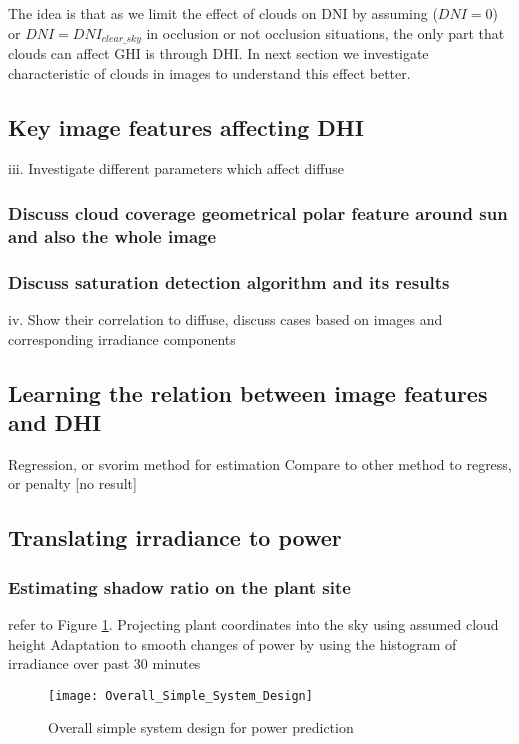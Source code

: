 The idea is that as we limit the effect of clouds on DNI by assuming ($DNI=0$) or $DNI=DNI_{clear\_sky}$ in occlusion or not occlusion situations, the only part that clouds can affect GHI is through DHI. In next section we investigate characteristic of clouds in images to understand this effect better.

\subsection{Key image features affecting DHI}
\label{sec:img-features}
iii.	Investigate different parameters which affect diffuse
\subsubsection{Discuss cloud coverage geometrical polar feature around sun and also the whole image}
\subsubsection{Discuss saturation detection algorithm and its results}


iv.	Show their correlation to diffuse, discuss cases based on images and corresponding irradiance components


\subsection{Learning the relation between image features and DHI}
Regression, or svorim method for estimation
Compare to other method to regress, or penalty [no result]



\subsection{Translating irradiance to power}
\subsubsection{Estimating shadow ratio on the plant site}
refer to Figure \ref{fig:overall_system_design_power}.
Projecting plant coordinates into the sky using assumed cloud height
Adaptation to smooth changes of power by using the histogram of irradiance over past 30 minutes
\begin{figure}[h]
\caption{Overall simple system design for power prediction}
\label{fig:overall_system_design_power}
\texttt{[image: Overall\_Simple\_System\_Design]}
\centering
\end{figure}
